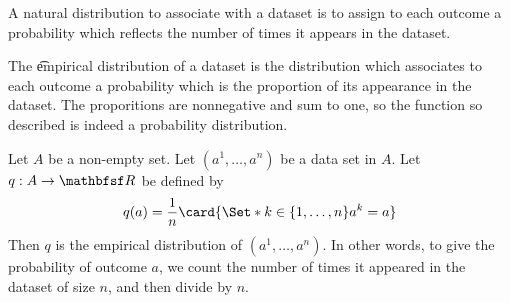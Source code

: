 
\sbasic








































\sstart
{}


A natural distribution to associate with a dataset is to assign to each outcome a probability which reflects the number of times it appears in the dataset.


The \t{empirical distribution} of a dataset is the distribution which associates to each outcome a probability which is the proportion of its appearance in the dataset.
The proporitions are nonnegative and sum to one, so the function so described is indeed a probability distribution.


Let $A$ be a non-empty set.
Let $(a^1, \dots, a^n)$ be a data set in $A$.
Let $q: A \to \R$ be defined by
$$
  q(a) = \frac{1}{n} \card{\Set*{k \in \set{1, \dots, n}}{a^k = a}}
$$
Then $q$ is the empirical distribution of $(a^1, \dots, a^n)$.
In other words, to give the probability of outcome $a$, we count the number of times it appeared in the dataset of size $n$, and then divide by $n$.
\strats
